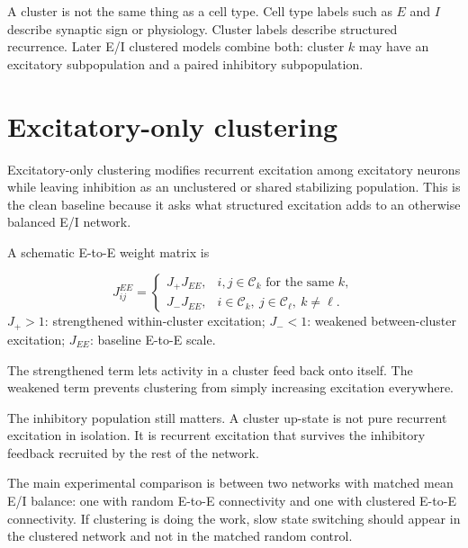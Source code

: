 A cluster is not the same thing as a cell type. Cell type labels such as $E$ and $I$ describe synaptic sign or physiology. Cluster labels describe structured recurrence. Later E/I clustered models combine both: cluster $k$ may have an excitatory subpopulation and a paired inhibitory subpopulation.

\section{Excitatory-only clustering}
\label{sec:excitatory-only-clustering}

Excitatory-only clustering modifies recurrent excitation among excitatory neurons while leaving inhibition as an unclustered or shared stabilizing population. This is the clean baseline because it asks what structured excitation adds to an otherwise balanced E/I network.

A schematic E-to-E weight matrix is
%
\begin{keyequation}
\begin{equation}
  J_{ij}^{EE}
  =
  \begin{cases}
    J_+J_{EE}, & i,j\in\mathcal{C}_k \text{ for the same }k,\\
    J_-J_{EE}, & i\in\mathcal{C}_k,\ j\in\mathcal{C}_{\ell},\ k\neq \ell .
  \end{cases}
  \label{eq:ee-clustered-weight-matrix-ch05}
\end{equation}
\tcblower
$J_+>1$: strengthened within-cluster excitation; $J_-<1$: weakened between-cluster excitation; $J_{EE}$: baseline E-to-E scale.
\end{keyequation}

\noindent The strengthened term lets activity in a cluster feed back onto itself. The weakened term prevents clustering from simply increasing excitation everywhere.

The inhibitory population still matters. A cluster up-state is not pure recurrent excitation in isolation. It is recurrent excitation that survives the inhibitory feedback recruited by the rest of the network.

The main experimental comparison is between two networks with matched mean E/I balance: one with random E-to-E connectivity and one with clustered E-to-E connectivity. If clustering is doing the work, slow state switching should appear in the clustered network and not in the matched random control.

